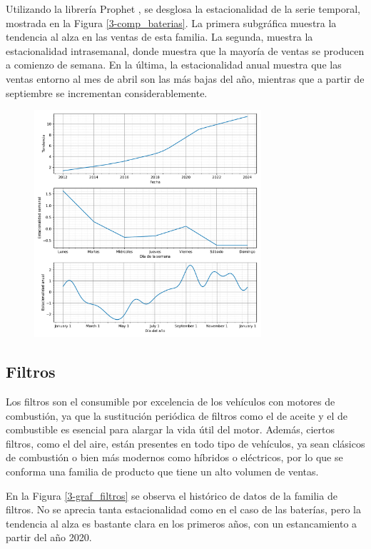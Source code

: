 Utilizando la librería Prophet \cite{prophet}, se desglosa la estacionalidad de la serie temporal, mostrada en la Figura \ref*{3-comp_baterias}. La primera subgráfica muestra la tendencia al alza en las ventas de esta familia. La segunda, muestra la estacionalidad intrasemanal, donde muestra que la mayoría de ventas se producen a comienzo de semana. En la última, la estacionalidad anual muestra que las ventas entorno al mes de abril son las más bajas del año, mientras que a partir de septiembre se incrementan considerablemente.

\begin{figure}[H]
	{\includegraphics[width=0.75\textwidth]{imagenes/comps_baterias.pdf}}
\end{figure}


\subsection{Filtros}

Los filtros son el consumible por excelencia de los vehículos con motores de combustión, ya que la sustitución periódica de filtros como el de aceite y el de combustible es esencial para alargar la vida útil del motor. Además, ciertos filtros, como el del aire, están presentes en todo tipo de vehículos, ya sean clásicos de combustión o bien más modernos como híbridos o eléctricos, por lo que se conforma una familia de producto que tiene un alto volumen de ventas.

En la Figura \ref*{3-graf_filtros} se observa el histórico de datos de la familia de filtros. No se aprecia tanta estacionalidad como en el caso de las baterías, pero la tendencia al alza es bastante clara en los primeros años, con un estancamiento a partir del año 2020.

